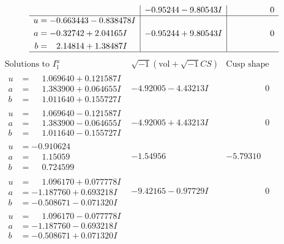 \documentclass[1p]{elsarticle_modified}
\theoremstyle{definition}
\newcommand{\I}{\sqrt{-1}}
\begin{document}
$$\begin{array}{c|c|c}
 & -0.95244 - 9.80543 I & \phantom{-0.000000 } 0 \\ \hline\begin{aligned}
u &= -0.663443 - 0.838478 I \\
a &= -0.32742 + 2.04165 I \\
b &= \phantom{-}2.14814 + 1.38487 I\end{aligned}
 & -0.95244 + 9.80543 I & \phantom{-0.000000 } 0\\
 \hline 
 \end{array}$$\newpage$$\begin{array}{c|c|c}  
\text{Solutions to }I^u_{1}& \I (\text{vol} + \sqrt{-1}CS) & \text{Cusp shape}\\
 \hline 
\begin{aligned}
u &= \phantom{-}1.069640 + 0.121587 I \\
a &= \phantom{-}1.383900 + 0.064655 I \\
b &= \phantom{-}1.011640 + 0.155727 I\end{aligned}
 & -4.92005 - 4.43213 I & \phantom{-0.000000 } 0 \\ \hline\begin{aligned}
u &= \phantom{-}1.069640 - 0.121587 I \\
a &= \phantom{-}1.383900 - 0.064655 I \\
b &= \phantom{-}1.011640 - 0.155727 I\end{aligned}
 & -4.92005 + 4.43213 I & \phantom{-0.000000 } 0 \\ \hline\begin{aligned}
u &= -0.910624\phantom{ +0.000000I} \\
a &= \phantom{-}1.15059\phantom{ +0.000000I} \\
b &= \phantom{-}0.724599\phantom{ +0.000000I}\end{aligned}
 & -1.54956\phantom{ +0.000000I} & -5.79310\phantom{ +0.000000I} \\ \hline\begin{aligned}
u &= \phantom{-}1.096170 + 0.077778 I \\
a &= -1.187760 + 0.693218 I \\
b &= -0.508671 - 0.071320 I\end{aligned}
 & -9.42165 - 0.97729 I & \phantom{-0.000000 } 0 \\ \hline\begin{aligned}
u &= \phantom{-}1.096170 - 0.077778 I \\
a &= -1.187760 - 0.693218 I \\
b &= -0.508671 + 0.071320 I\end{aligned}

\end{array}$$
\end{document}
